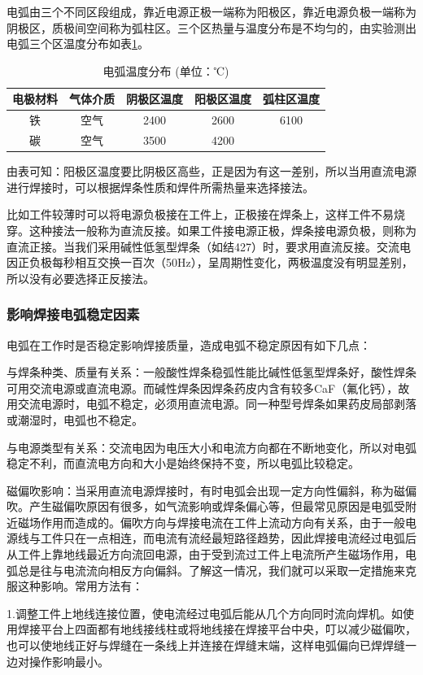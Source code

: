 \documentclass{ctexbook}
\begin{document}
电弧由三个不同区段组成，靠近电源正极一端称为阳极区，靠近电源负极一端称为阴极区，质极间空间称为弧柱区。三个区热量与温度分布是不均匀的，由实验测出电弧三个区温度分布如表\ref{tab:dianhuwendu}。
\begin{table}[htbp]
	\centering
	\caption{电弧温度分布 (单位：℃)}
	\begin{tabular}{c|c|c|c|c}
		\hline
		电极材料  & 气体介质  & 阴极区温度 & 阳极区温度 & 弧柱区温度 \\ \hline
		铁     & 空气    & 2400  & 2600  & 6100 \\ \hline
		碳     & 空气    & 3500  & 4200  &  \\ \hline
	\end{tabular}%
	\label{tab:dianhuwendu}%
\end{table}%
由表可知：阳极区温度要比阴极区高些，正是因为有这一差别，所以当用直流电源进行焊接时，可以根据焊条性质和焊件所需热量来选择接法。

比如工件较薄时可以将电源负极接在工件上，正极接在焊条上，这样工件不易烧穿。这种接法一般称为直流反接。如果工件接电源正极，焊条接电源负极，则称为直流正接。当我们采用碱性低氢型焊条（如结427）时，要求用直流反接。交流电因正负极每秒相互交换一百次（50Hz），呈周期性变化，两极温度没有明显差别，所以没有必要选择正反接法。
\subsubsection{影响焊接电弧稳定因素}
电弧在工作时是否稳定影响焊接质量，造成电弧不稳定原因有如下几点：

与焊条种类、质量有关系：一般酸性焊条稳弧性能比碱性低氢型焊条好，酸性焊条可用交流电源或直流电源。而碱性焊条因焊条药皮内含有较多CaF（氟化钙），故用交流电源时，电弧不稳定，必须用直流电源。同一种型号焊条如果药皮局部剥落或潮湿时，电弧也不稳定。

与电源类型有关系：交流电因为电压大小和电流方向都在不断地变化，所以对电弧稳定不利，而直流电方向和大小是始终保持不变，所以电弧比较稳定。

磁偏吹影响：当采用直流电源焊接时，有时电弧会出现一定方向性偏斜，称为磁偏吹。产生磁偏吹原因有很多，如气流影响或焊条偏心等，但最常见原因是电弧受附近磁场作用而造成的。偏吹方向与焊接电流在工件上流动方向有关系，由于一般电源线与工件只在一点相连，而电流有流经最短路径趋势，因此焊接电流经过电弧后从工件上靠地线最近方向流回电源，由于受到流过工件上电流所产生磁场作用，电弧总是往与电流流向相反方向偏斜。了解这一情况，我们就可以采取一定措施来克服这种影响。常用方法有：

1.调整工件上地线连接位置，使电流经过电弧后能从几个方向同时流向焊机。如使用焊接平台上四面都有地线接线柱或将地线接在焊接平台中央，叮以减少磁偏吹，也可以使地线正好与焊缝在一条线上并连接在焊缝末端，这样电弧偏向已焊焊缝一边对操作影响最小。
\end{document}

